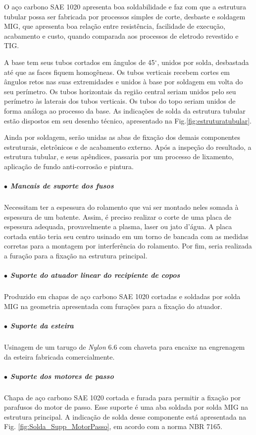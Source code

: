 O aço carbono SAE 1020 apresenta boa soldabilidade e faz com que a estrutura tubular possa ser fabricada por processos simples de corte, desbaste e soldagem MIG, que apresenta boa relação entre resistência, facilidade de execução, acabamento e custo, quando comparada aos processos de eletrodo revestido e TIG.

A base tem seus tubos cortados em ângulos de 45$^{\circ}$, unidos por solda, desbastada até que as faces fiquem homogêneas. Os tubos verticais recebem cortes em ângulos retos nas suas extremidades e unidos à base por soldagem em volta do seu perímetro. Os tubos horizontais da região central seriam unidos pelo seu perímetro às laterais dos tubos verticais. Os tubos do topo seriam unidos de forma análoga ao processo da base. As indicações de solda da estrutura tubular estão dispostos em seu desenho técnico, apresentado na Fig.\ref{fig:estruturatubular}.

Ainda por soldagem, serão unidas as abas de fixação dos demais componentes estruturais, eletrônicos e de acabamento externo. Após a inspeção do resultado, a estrutura tubular, e seus apêndices, passaria por um processo de lixamento, aplicação de fundo anti-corrosão e pintura.

\subparagraph*{$\bullet$ Mancais de suporte dos fusos} \hfill

Necessitam ter a espessura do rolamento que vai ser montado neles somada à espessura de um batente. Assim, é preciso realizar o corte de uma placa de espessura adequada, provavelmente a plasma, laser ou jato d'água. A placa cortada então teria seu centro usinado em um torno de bancada com as medidas corretas para a montagem por interferência do rolamento. Por fim, seria realizada a furação para a fixação na estrutura principal.

\subparagraph*{$\bullet$ Suporte do atuador linear do recipiente de copos} \hfill

Produzido em chapas de aço carbono SAE 1020 cortadas e soldadas por solda MIG na geometria apresentada com furações para a fixação do atuador.

\subparagraph*{$\bullet$ Suporte da esteira} \hfill

Usinagem de um tarugo de \textit{Nylon} 6.6 com chaveta para encaixe na engrenagem da esteira fabricada comercialmente.

\subparagraph*{$\bullet$ Suporte dos motores de passo} \hfill

Chapa de aço carbono SAE 1020 cortada e furada para permitir a fixação por parafusos do motor de passo. Esse suporte é uma aba soldada por solda MIG na estrutura principal. A indicação de solda desse componente está apresentada na Fig. \ref{fig:Solda_Supp_MotorPasso}, em acordo com a norma NBR 7165.

